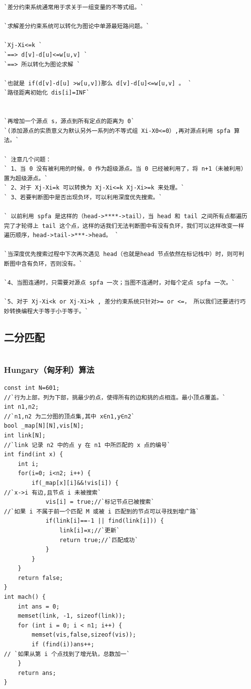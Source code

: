 \documentclass[a4paper]{article}
\begin{document}
\begin{CJK*}{UTF8}{gbsn}
\begin{multicols}{3}
\begin{flushleft}
\begin{lstlisting}
`差分约束系统通常用于求关于一组变量的不等式组。`

`求解差分约束系统可以转化为图论中单源最短路问题。`

`Xj-Xi<=k `
`==> d[v]-d[u]<=w[u,v] `
`==> 所以转化为图论求解 `

`也就是 if(d[v]-d[u] >w[u,v])那么 d[v]-d[u]<=w[u,v] 。 `
`路径距离初始化 dis[i]=INF`


`再增加一个源点 s，源点到所有定点的距离为 0`
`(添加源点的实质意义为默认另外一系列的不等式组 Xi-X0<=0）,再对源点利用 spfa 算法。`
 
` 注意几个问题：
` 1、当 0 没有被利用的时候，0 作为超级源点。当 0 已经被利用了，将 n+1（未被利用）置为超级源点。`
` 2、对于 Xj-Xi=k 可以转换为 Xj-Xi<=k Xj-Xi>=k 来处理。`
` 3、若要判断图中是否出现负环，可以利用深度优先搜索。`
 
` 以前利用 spfa 是这样的（head->****->tail），当 head 和 tail 之间所有点都遍历完了才轮得上 tail 这个点，这样的话我们无法判断图中有没有负环，我们可以这样改变一样遍历顺序，head->tail->***->head。 `

`当深度优先搜索过程中下次再次遇见 head（也就是head 节点依然在标记栈中）时，则可判断图中含有负环，否则没有。`

`4、当图连通时，只需要对源点 spfa 一次；当图不连通时，对每个定点 spfa 一次。`

`5、对于 Xj-Xi<k or Xj-Xi>k , 差分约束系统只针对>= or <=， 所以我们还要进行巧妙转换编程大于等于小于等于。`
\end{lstlisting}

\subsection{二分匹配}
\begin{lstlisting}
\end{lstlisting}

\subsubsection{Hungary（匈牙利）算法}
\begin{lstlisting}
const int N=601;
//`行为上部，列为下部，挑最少的点，使得所有的边和挑的点相连。最小顶点覆盖。`
int n1,n2;
//`n1,n2 为二分图的顶点集,其中 x∈n1,y∈n2`
bool _map[N][N],vis[N];
int link[N];
//`link 记录 n2 中的点 y 在 n1 中所匹配的 x 点的编号`
int find(int x) {
    int i;
    for(i=0; i<n2; i++) {
        if(_map[x][i]&&!vis[i]) {
//`x->i 有边,且节点 i 未被搜索`
            vis[i] = true;//`标记节点已被搜索`
//`如果 i 不属于前一个匹配 M 或被 i 匹配到的节点可以寻找到增广路`
            if(link[i]==-1 || find(link[i])) {
                link[i]=x;//`更新`
                return true;//`匹配成功`
            }
        }
    }
    return false;
}
int mach() {
    int ans = 0;
    memset(link, -1, sizeof(link));
    for (int i = 0; i < n1; i++) {
        memset(vis,false,sizeof(vis));
        if (find(i))ans++;
// `如果从第 i 个点找到了增光轨，总数加一`
    }
    return ans;
}
\end{lstlisting}


\end{flushleft}
\end{multicols}
\end{CJK*}
\end{document}
